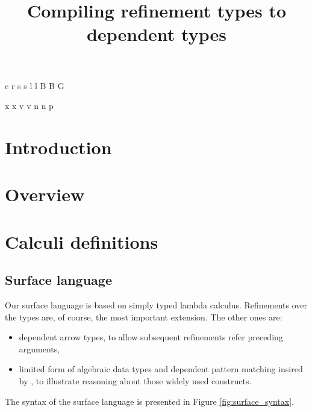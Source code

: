 \documentclass[a4paper]{article}
\begin{document}
\newnonterm e \varepsilon
{}
\newnonterm r \rho
{}
\newnonterm s s
\newnonterm l l
\newnonterm B B
\newnonterm G \Gamma
{}

\newgterm x x
\newgterm v v
\newgterm n n
\newgterm p \pi

\newcommand{\figref}[1]{Figure \ref{fig:#1}}


\title{Compiling refinement types to dependent types}

\maketitle

\section{Introduction}

\section{Overview}


\section{Calculi definitions}

\subsection{Surface language}

Our surface language is based on simply typed lambda calculus.
Refinements over the types are, of course, the most important extension.
The other ones are:
\begin{itemize}
  \item dependent arrow types, to allow subsequent refinements refer preceding arguments,
  \item limited form of algebraic data types and dependent pattern matching
    insired by \cite{TAPLVariants,Eisenberg16},
    to illustrate reasoning about those widely used constructs.
\end{itemize}

The syntax of the surface language is presented in \figref{surface_syntax}.
\end{document}
